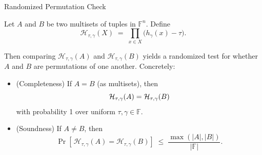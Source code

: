 \documentclass{zkdl-presentation-template}
\begin{document}
    \begin{frame}{Randomized Permutation Check}
        \begin{definition}
            Let $A$ and $B$ be two multisets of tuples in $\mathbb{F}^n$. Define
            \begin{equation*}
                \mathcal{H}_{\tau,\gamma}(X)\;=\;\prod_{x \in X}\bigl(h_{\gamma}(x)-\tau\bigr).
            \end{equation*}
            
            Then comparing $\mathcal{H}_{\tau,\gamma}(A)$ and $\mathcal{H}_{\tau,\gamma}(B)$ yields a
            randomized test for whether $A$ and $B$ are permutations of one another. Concretely:
            \begin{itemize}
                \item (Completeness) If $A=B$ (as multisets), then  
                    \vspace{-5px}
                    \begin{equation*}
                        \mathcal{H}_{\tau,\gamma}(A)=\mathcal{H}_{\tau,\gamma}(B)
                        \vspace{-5px}
                    \end{equation*}
                    with probability 1 over uniform $\tau,\gamma\in\mathbb{F}$.
                \item (Soundness) If $A\neq B$, then
                    \vspace{-5px}
                    \begin{equation*}
                        \Pr\left[\,\mathcal{H}_{\tau,\gamma}(A)=\mathcal{H}_{\tau,\gamma}(B)\right]\;\le\; \frac{\max(|A|,|B|)}{|\mathbb{F}|}.
                    \end{equation*}
            \end{itemize}
        \end{definition}
    \end{frame}
\end{document}
